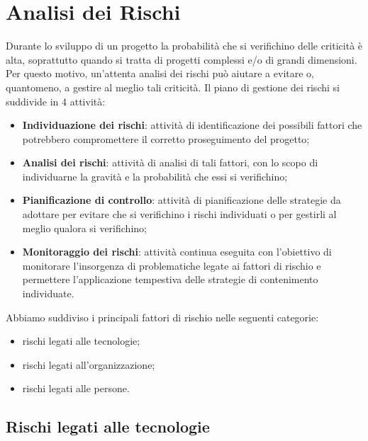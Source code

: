 \section{Analisi dei Rischi}
Durante lo sviluppo di un progetto la probabilità che si verifichino delle criticità è alta, 
soprattutto quando si tratta di progetti complessi e/o di grandi dimensioni. Per questo motivo,
un'attenta analisi dei rischi può aiutare a evitare o, quantomeno, a gestire al meglio tali criticità.
Il piano di gestione dei rischi si suddivide in 4 attività:
\begin{itemize}
    \item \textbf{Individuazione dei rischi}: attività di identificazione dei possibili fattori che potrebbero compromettere il corretto proseguimento del progetto;
    \item \textbf{Analisi dei rischi}: attività di analisi di tali fattori, con lo scopo di individuarne la gravità e la probabilità che essi si verifichino;
    \item \textbf{Pianificazione di controllo}: attività di pianificazione delle strategie da adottare per evitare che si verifichino i rischi individuati o per gestirli al meglio qualora si verifichino;
    \item \textbf{Monitoraggio dei rischi}: attività continua eseguita con l'obiettivo di monitorare l'insorgenza di problematiche legate ai fattori di rischio e permettere l'applicazione tempestiva delle strategie di contenimento individuate.
\end{itemize}
Abbiamo suddiviso i principali fattori di rischio nelle seguenti categorie:
\begin{itemize}
    \item rischi legati alle tecnologie;
    \item rischi legati all’organizzazione;
    \item rischi legati alle persone.
\end{itemize}

\subsection{Rischi legati alle tecnologie}

